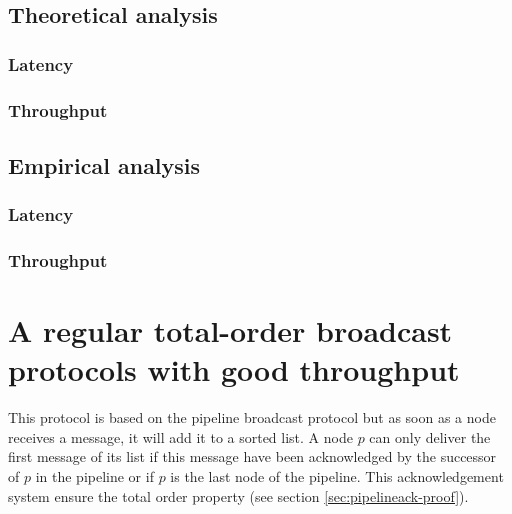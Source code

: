 \documentclass[a4paper]{article}
\begin{document}
        \subsection{Theoretical analysis}

        \subsubsection*{Latency}

        \subsubsection*{Throughput}

        \subsection{Empirical analysis}

        \subsubsection*{Latency}

        \subsubsection*{Throughput}

        \section{A regular total-order broadcast protocols with good throughput}
        \label{sec:throughputTO}

        This protocol is based on the pipeline broadcast protocol but as soon as a node
        receives a message, it will add it to a sorted list. A node $p$ can only deliver the
        first message of its list if this message have been acknowledged by the
        successor of $p$ in the pipeline or if $p$ is the last node of the pipeline.
        This acknowledgement system ensure the total order property (see section
        \ref{sec:pipelineack-proof}).
\end{document}
